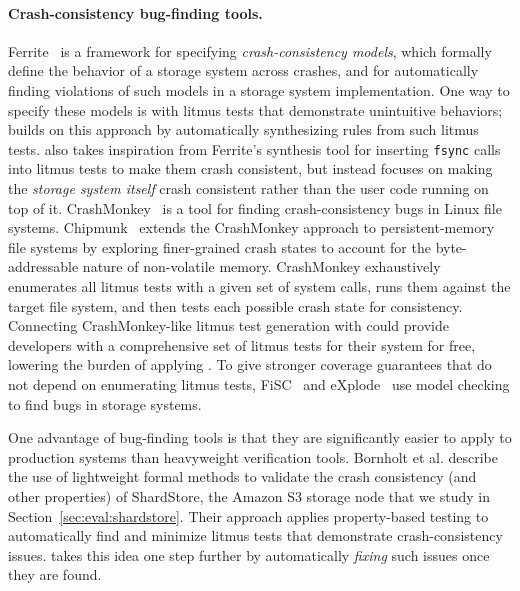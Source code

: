 \paragraph{Crash-consistency bug-finding tools.}
Ferrite~\cite{bornholt:ferrite} is a framework for specifying \emph{crash-consistency models},
which formally define the behavior of a storage system across crashes,
and for automatically finding violations of such models in a storage system implementation.
One way to specify these models is with litmus tests that demonstrate unintuitive behaviors;
\depsynth builds on this approach by automatically synthesizing rules from such litmus tests.
\depsynth also takes inspiration from Ferrite's synthesis tool
for inserting \texttt{fsync} calls into litmus tests to make them crash consistent,
but instead focuses on making the \emph{storage system itself} crash consistent
rather than the user code running on top of it.
CrashMonkey~\cite{mohan:crashmonkey} is a tool for finding crash-consistency bugs in Linux file systems.
Chipmunk~\cite{leblanc:chipmunk} extends the CrashMonkey approach to persistent-memory file systems
by exploring finer-grained crash states to account for the byte-addressable nature of non-volatile memory.
CrashMonkey exhaustively enumerates all litmus tests with a given set of system calls,
runs them against the target file system,
and then tests each possible crash state for consistency.
Connecting CrashMonkey-like litmus test generation with \depsynth
could provide developers with a comprehensive set of litmus tests for their system for free,
lowering the burden of applying \depsynth.
To give stronger coverage guarantees that do not depend on enumerating litmus tests,
FiSC~\cite{yang:fisc} and eXplode~\cite{yang:explode}
use model checking to find bugs in storage systems.

One advantage of bug-finding tools is that they are significantly easier to apply to production systems
than heavyweight verification tools.
Bornholt et al. \cite{bornholt:s3} describe the use of lightweight formal methods
to validate the crash consistency (and other properties)
of ShardStore, the Amazon S3 storage node that we study in Section~\ref{sec:eval:shardstore}.
Their approach applies property-based testing to automatically find and minimize litmus tests
that demonstrate crash-consistency issues.
\depsynth takes this idea one step further by automatically \emph{fixing} such issues once they are found.

